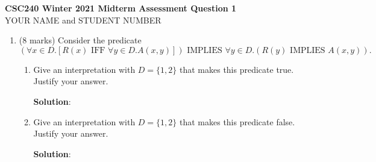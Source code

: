\documentclass[11pt]{article}
\newcommand{\Implies}{\mbox{ IMPLIES }}
\newcommand{\Iff}{\mbox{ IFF }}
\begin{document}
\begin{center}
{\bf \Large \bf CSC240 Winter 2021 Midterm Assessment Question 1}\\
YOUR NAME and STUDENT NUMBER
\end{center}

\medskip

\begin{enumerate}\item
\begin{question}
(8 marks)
Consider the predicate
$$(\forall x \in D.[R(x) \Iff \forall y \in D.A(x,y)]) \Implies \forall y \in D. (R(y) \Implies A(x,y)).$$
\end{question}

\begin{enumerate}
\item
\begin{question}
Give an interpretation with $D=\{1,2\}$ that makes this predicate true. Justify your answer.
\end{question}

\begin{solution}
{\bf Solution}:

\end{solution}

\item
\begin{question}
Give an interpretation with $D=\{1,2\}$ that makes this predicate false.  Justify your answer.
\end{question}

\begin{solution}
{\bf Solution}:

\end{solution}
\end{enumerate}
\end{enumerate}
\end{document}
